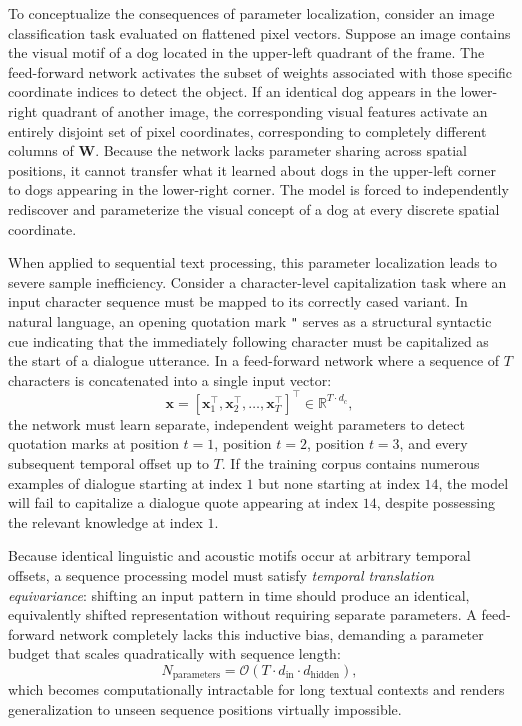 \documentclass[../../main.tex]{subfiles}
\begin{document}
To conceptualize the consequences of parameter localization, consider an image classification task evaluated on flattened pixel vectors. Suppose an image contains the visual motif of a dog located in the upper-left quadrant of the frame. The feed-forward network activates the subset of weights associated with those specific coordinate indices to detect the object. If an identical dog appears in the lower-right quadrant of another image, the corresponding visual features activate an entirely disjoint set of pixel coordinates, corresponding to completely different columns of $\mathbf{W}$. Because the network lacks parameter sharing across spatial positions, it cannot transfer what it learned about dogs in the upper-left corner to dogs appearing in the lower-right corner. The model is forced to independently rediscover and parameterize the visual concept of a dog at every discrete spatial coordinate.

When applied to sequential text processing, this parameter localization leads to severe sample inefficiency. Consider a character-level capitalization task where an input character sequence must be mapped to its correctly cased variant. In natural language, an opening quotation mark \texttt{"} serves as a structural syntactic cue indicating that the immediately following character must be capitalized as the start of a dialogue utterance. In a feed-forward network where a sequence of $T$ characters is concatenated into a single input vector:
\begin{equation}
\mathbf{x} = \left[\mathbf{x}_1^\top, \mathbf{x}_2^\top, \dots, \mathbf{x}_T^\top\right]^\top \in \mathbb{R}^{T \cdot d_c},
\end{equation}
the network must learn separate, independent weight parameters to detect quotation marks at position $t=1$, position $t=2$, position $t=3$, and every subsequent temporal offset up to $T$. If the training corpus contains numerous examples of dialogue starting at index $1$ but none starting at index $14$, the model will fail to capitalize a dialogue quote appearing at index $14$, despite possessing the relevant knowledge at index $1$.

Because identical linguistic and acoustic motifs occur at arbitrary temporal offsets, a sequence processing model must satisfy \textit{temporal translation equivariance}: shifting an input pattern in time should produce an identical, equivalently shifted representation without requiring separate parameters. A feed-forward network completely lacks this inductive bias, demanding a parameter budget that scales quadratically with sequence length:
\begin{equation}
N_{\text{parameters}} = \mathcal{O}\left(T \cdot d_{\text{in}} \cdot d_{\text{hidden}}\right),
\end{equation}
which becomes computationally intractable for long textual contexts and renders generalization to unseen sequence positions virtually impossible.
\end{document}
